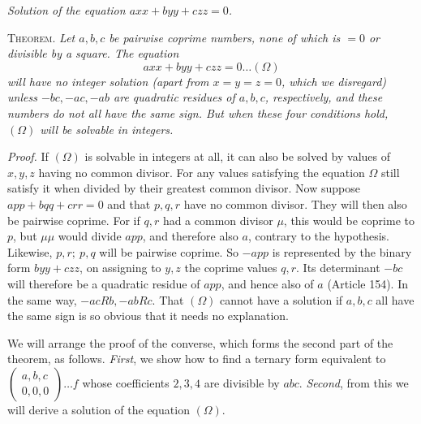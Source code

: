 \begin{center}\textit{Solution of the equation \(axx+byy+czz=0\).}\end{center}
\textsc{Theorem.} \textit{Let \(a,b,c\) be pairwise coprime numbers, none
of which is \(=0\) or divisible by a square. The equation}
\[
axx+byy+czz=0\ldots(\Omega)
\]
\textit{will have no integer solution (apart from \(x=y=z=0\), which we
disregard) unless \(-bc,-ac,-ab\) are quadratic residues of \(a,b,c\), respectively,
and these numbers do not all have the same sign. But when these four
conditions hold, \((\Omega)\) will be solvable in integers.}

\textit{Proof.} If \((\Omega)\) is solvable in integers at all, it can also
be solved by values of \(x,y,z\) having no common divisor. For any values
satisfying the equation \(\Omega\) still satisfy it when divided by their
greatest common divisor. Now suppose \(app+bqq+crr=0\) and that \(p,q,r\) have
no common divisor. They will then also be pairwise coprime. For if
\(q,r\) had a common divisor \(\mu\), this would be coprime to \(p\),
but \(\mu\mu\) would divide \(app\), and therefore also \(a\), contrary
to the hypothesis. Likewise, \(p,r;\ p,q\) will be pairwise coprime. So
\(-app\) is represented by the binary form \(byy+czz\),
on assigning to \(y,z\) the coprime values \(q,r\). Its determinant
\(-bc\) will therefore be a quadratic residue of \(app\), and hence
also of \(a\) (Article 154). In the same way, \(-acRb,-abRc\). That \((\Omega)\)
cannot have a solution if \(a,b,c\) all have the same sign is so obvious
that it needs no explanation.

We will arrange the proof of the converse, which forms the second
part of the theorem, as follows. \textit{First}, we show how to find
a ternary form equivalent to \(\left(\begin{smallmatrix}a,b,c\\0,0,0\end{smallmatrix}\right)\ldots f\) whose coefficients \(2,3,4\) are
divisible by \(abc\). \textit{Second}, from this we will derive a
solution of the equation \((\Omega)\).

